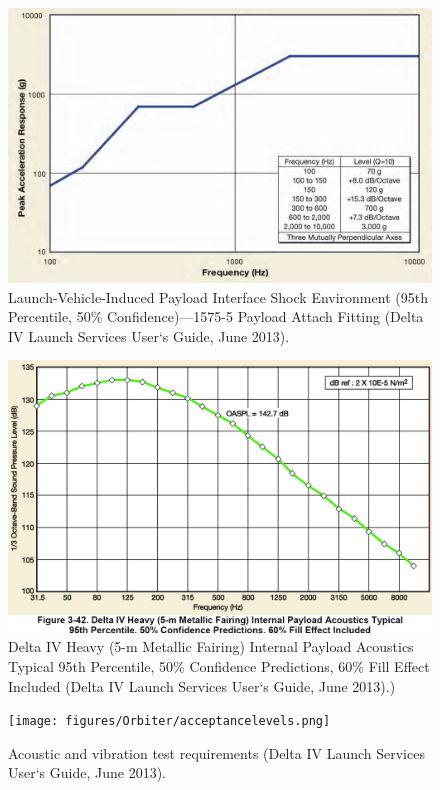 \begin{figure}[htb]
\centering
\includegraphics[scale=0.3]{figures/Orbiter/before_fair_sep.png}
\caption{Launch-Vehicle-Induced Payload Interface Shock Environment (95th Percentile, 50\% Confidence)—1575-5 Payload Attach Fitting (Delta IV Launch Services User‘s Guide, June 2013).\cite{Atlasm}}
\end{figure}

\begin{figure}[htb]
\centering
\includegraphics[scale=0.3]{figures/Orbiter/acoustics.png}
\caption{Delta IV Heavy (5-m Metallic Fairing) Internal Payload Acoustics Typical 95th Percentile, 50\% Confidence Predictions, 60\% Fill Effect Included (Delta IV Launch Services User‘s Guide, June 2013).) \cite{Atlasm}}
\end{figure}

\begin{figure}[htb]
\centering
\texttt{[image: figures/Orbiter/acceptancelevels.png]}
\caption{Acoustic and vibration test requirements (Delta IV Launch Services User‘s Guide, June 2013).\cite{Atlasm}}
\label{fig:testlevels}
\end{figure}

